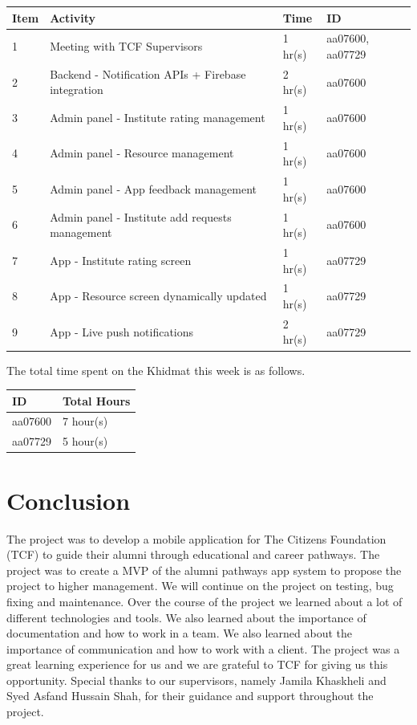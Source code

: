 \documentclass[12pt,a4paper]{article}
\begin{document}
\begin{center}
    \bigskip
    \begin{tabular}{|l|l|l|l|}
        \hline
        Item 	& Activity & Time & ID \\\hline\hline
        1	& Meeting with TCF Supervisors  & 1 hr(s) & aa07600, aa07729 \\\hline\hline
        2	& Backend - Notification APIs + Firebase integration & 2 hr(s) & aa07600 \\\hline
        3	& Admin panel - Institute rating management & 1 hr(s) & aa07600 \\\hline
        4	& Admin panel - Resource management & 1 hr(s) & aa07600 \\\hline
        5	& Admin panel - App feedback management & 1 hr(s) & aa07600 \\\hline
        6	& Admin panel - Institute add requests management & 1 hr(s) & aa07600 \\\hline\hline
        7	& App - Institute rating screen & 1 hr(s) & aa07729 \\\hline
        8	& App - Resource screen dynamically updated & 1 hr(s) & aa07729 \\\hline
        9	& App - Live push notifications & 2 hr(s) & aa07729 \\\hline
    \end{tabular}

    \bigskip
    The total time spent on the Khidmat this week is as follows.

    \bigskip
    \begin{tabular}{|l|l|}
        \hline
        ID & Total Hours\\\hline\hline
        aa07600 & 7 hour(s)\\\hline
        aa07729 & 5 hour(s)\\\hline
    \end{tabular}
\end{center}

\newpage

\section{Conclusion}

The project was to develop a mobile application for The Citizens Foundation (TCF) to guide their alumni through educational and career pathways. The project was to create a MVP of the alumni pathways app system to propose the project to higher management. We will continue on the project on testing, bug fixing and maintenance. Over the course of the project we learned about a lot of different technologies and tools. We also learned about the importance of documentation and how to work in a team. We also learned about the importance of communication and how to work with a client. The project was a great learning experience for us and we are grateful to TCF for giving us this opportunity. Special thanks to our supervisors, namely Jamila Khaskheli and Syed Asfand Hussain Shah, for their guidance and support throughout the project.
\end{document}

